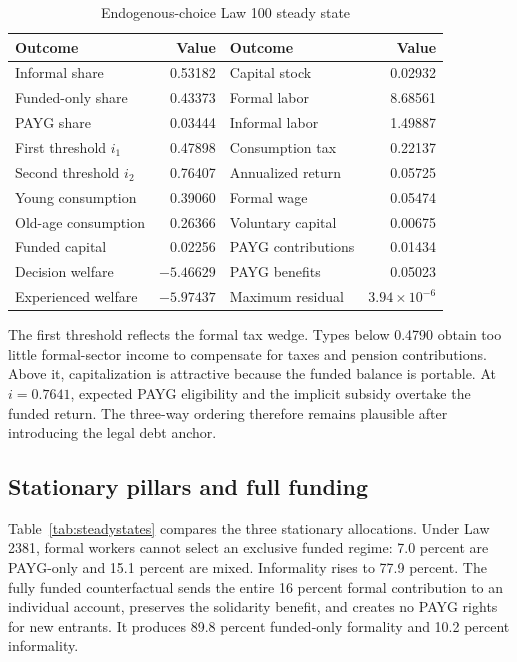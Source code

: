 \documentclass[12pt]{article}
\newcommand{\1}{\mathbf{1}}
\begin{document}
\begin{table}[htbp]\centering
\caption{Endogenous-choice Law 100 steady state}\label{tab:benchmark}
\begin{tabular}{lr@{\qquad}lr}
\toprule Outcome&Value&Outcome&Value\\ \midrule
Informal share&0.53182&Capital stock&0.02932\\
Funded-only share&0.43373&Formal labor&8.68561\\
PAYG share&0.03444&Informal labor&1.49887\\
First threshold $i_1$&0.47898&Consumption tax&0.22137\\
Second threshold $i_2$&0.76407&Annualized return&0.05725\\
Young consumption&0.39060&Formal wage&0.05474\\
Old-age consumption&0.26366&Voluntary capital&0.00675\\
Funded capital&0.02256&PAYG contributions&0.01434\\
Decision welfare&$-5.46629$&PAYG benefits&0.05023\\
Experienced welfare&$-5.97437$&Maximum residual&$3.94\times10^{-6}$\\
\bottomrule
\end{tabular}
\end{table}

The first threshold reflects the formal tax wedge. Types below 0.4790 obtain too little
formal-sector income to compensate for taxes and pension contributions. Above it,
capitalization is attractive because the funded balance is portable. At $i=0.7641$, expected
PAYG eligibility and the implicit subsidy overtake the funded return. The three-way ordering
therefore remains plausible after introducing the legal debt anchor.

\subsection{Stationary pillars and full funding}

Table~\ref{tab:steadystates} compares the three stationary allocations. Under Law 2381,
formal workers cannot select an exclusive funded regime: 7.0 percent are PAYG-only and 15.1
percent are mixed. Informality rises to 77.9 percent. The fully funded counterfactual sends the
entire 16 percent formal contribution to an individual account, preserves the solidarity
benefit, and creates no PAYG rights for new entrants. It produces 89.8 percent funded-only
formality and 10.2 percent informality.
\end{document}
